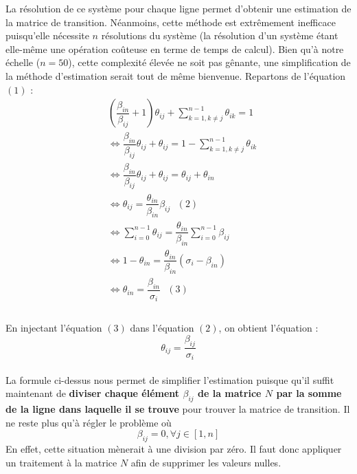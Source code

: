 \documentclass[a4paper,titlepage]{report}
\begin{document}
La résolution de ce système pour chaque ligne permet d'obtenir une estimation de la matrice de transition. Néanmoins, cette méthode est extrêmement inefficace puisqu'elle nécessite $n$ résolutions du système (la résolution d'un système étant elle-même une opération coûteuse en terme de temps de calcul). Bien qu'à notre échelle ($n = 50$), cette complexité élevée ne soit pas gênante, une simplification de la méthode d'estimation serait tout de même bienvenue. Repartons de l'équation $(1)$ : 
\[
\begin{aligned}
	&\left(\dfrac{\beta_{in}}{\beta_{ij}} + 1\right) \theta_{ij} + \sum\limits_{k = 1, k \neq j}^{n - 1} \theta_{ik} = 1\\
	&\Leftrightarrow \dfrac{\beta_{in}}{\beta_{ij}} \theta_{ij} + \theta_{ij} = 1 - \sum\limits_{k = 1, k \neq j}^{n - 1} \theta_{ik}\\
	&\Leftrightarrow \dfrac{\beta_{in}}{\beta_{ij}} \theta_{ij} + \theta_{ij} = \theta_{ij} + \theta_{in}\\
	&\Leftrightarrow \theta_{ij}= \dfrac{\theta_{in}}{\beta_{in}} \beta_{ij}\text{ }(2)\\
	&\Leftrightarrow \sum\limits_{i = 0}^{n - 1} \theta_{ij} = \dfrac{\theta_{in}}{\beta_{in}} \sum\limits_{i = 0}^{n - 1}\beta_{ij}\\
	&\Leftrightarrow 1 - \theta_{in} = \dfrac{\theta_{in}}{\beta_{in}} \left(\sigma_i - \beta_{in}\right)\\	
	&\Leftrightarrow \theta_{in} = \dfrac{\beta_{in}}{\sigma_{i}} \text{ }(3)\\	
\end{aligned}
\]
\paragraph{}
En injectant l'équation $(3)$ dans l'équation $(2)$, on obtient l'équation :
\[
\theta_{ij} = \dfrac{\beta_{ij}}{\sigma_{i}}
\]
\paragraph{}
La formule ci-dessus nous permet de simplifier l'estimation puisque qu'il suffit maintenant de \textbf{diviser chaque élément $\beta_{ij}
$ de la matrice $N$ par la somme de la ligne dans laquelle il se trouve} pour trouver la matrice de transition. Il ne reste plus qu'à régler le problème où
\[
\beta_{ij} = 0, \forall j \in [1,n]
\]
En effet, cette situation mènerait à une division par zéro. Il faut donc appliquer un traitement à la matrice $N$ afin de supprimer les valeurs nulles.
\end{document}
